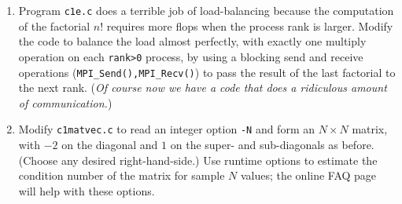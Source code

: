 \renewcommand{\labelenumi}{\arabic{chapter}.\arabic{enumi}\quad}
\begin{enumerate}
\item Program \texttt{c1e.c} does a terrible job of load-balancing because the computation of the factorial $n!$ requires more flops when the process rank is larger.  Modify the code to balance the load almost perfectly, with exactly one multiply operation on each \texttt{rank>0} process, by using a blocking send and receive operations (\texttt{MPI\_Send(),MPI\_Recv()}) to pass the result of the last factorial to the next rank.  (\emph{Of course now we have a code that does a ridiculous amount of communication.})
\item Modify \texttt{c1matvec.c} to read an integer option \texttt{-N} and form an $N\times N$ matrix, with $-2$ on the diagonal and $1$ on the super- and sub-diagonals as before.  (Choose any desired right-hand-side.)  Use \PETSc runtime options to estimate the condition number of the matrix for sample $N$ values; the online \PETSc FAQ page will help with these options.
\end{enumerate}